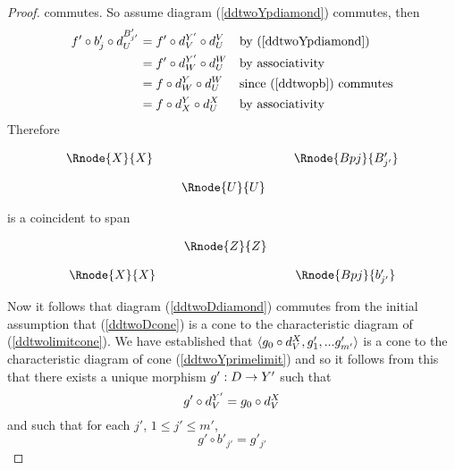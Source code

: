 \documentclass[10pt,a4paper]{scrartcl}
\begin{document}
\begin{proof}
commutes. So assume  diagram (\ref{ddtwoYpdiamond}) commutes, then
\begin{align*}
f' \circ b'_j \circ d^{B'_{j'}}_{U}
            &= f' \circ d^{Y'}_{V} \circ d^{V}_{U} & & \mbox{by }(\ref{ddtwoYpdiamond}) \\
            &= f' \circ d^{Y'}_{W} \circ d^{W}_{U} & & \mbox{by associativity}         \\
						&= f \circ d^{Y}_{W} \circ d^{W}_{U} & & \mbox{since (\ref{ddtwopb}) commutes} \\
						&= f \circ d^{Y}_{X} \circ d^{X}_{U} & & \mbox{by associativity} 
\end{align*}
Therefore
\begin{center}
\begin{equation}
\begin{array}{cp{0.1cm}cp{0.1cm} c}
\Rnode{X}{X}& &                & & \Rnode{Bpj}{B'_{j'}} \\ [0.4cm]
            & &\Rnode{U}{U}
\end{array}
\end{equation}
\end{center}
is a coincident  to span 
\begin{center}
\begin{equation}
\begin{array}{cp{0.1cm}cp{0.1cm} c}
            & &\Rnode{Z}{Z}                  \\ [0.4cm]
\Rnode{X}{X}& &                & & \Rnode{Bpj}{b'_{j'}} 
\end{array}
\end{equation}
\end{center}

\noindent
Now it follows that diagram (\ref{ddtwoDdiamond}) commutes from the initial assumption that (\ref{ddtwoDcone}) is a cone to the characteristic diagram of (\ref{ddtwolimitcone}).
We have established
that $\langle g_0 \circ d^{X}_{V},g'_1,...g'_{m'}\rangle$ is a cone to the characteristic diagram of cone (\ref{ddtwoYprimelimit}) and so  it follows from this 
that there exists a unique morphism $g': D \rightarrow Y'$ such that 
\begin{equation}
\label{ddtwogpfactorg0}
g' \circ d^{Y'}_{V} = g_0 \circ d^{X}_{V}
\end{equation}
and such that for each $j'$, $1 \leq j' \leq m'$,
\begin{equation}
\label{ddtwofactorgpj}
g' \circ b'_{j'} = g'_{j'}
\end{equation}


\end{proof}
\end{document}
